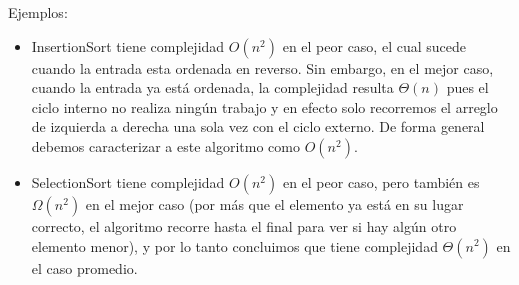Ejemplos:

\begin{itemize}
    \item InsertionSort tiene complejidad $O(n^2)$ en el peor caso, el cual sucede cuando la entrada esta ordenada en reverso. Sin embargo, en el mejor caso, cuando la entrada ya está ordenada, la complejidad resulta $\Theta(n)$ pues el ciclo interno no realiza ningún trabajo y en efecto solo recorremos el arreglo de izquierda a derecha una sola vez con el ciclo externo. De forma general debemos caracterizar a este algoritmo como $O(n^2)$.
    \item SelectionSort tiene complejidad $O(n^2)$ en el peor caso, pero también es $\Omega(n^2)$ en el mejor caso (por más que el elemento ya está en su lugar correcto, el algoritmo recorre hasta el final para ver si hay algún otro elemento menor), y por lo tanto concluimos que tiene complejidad $\Theta(n^2)$ en el caso promedio.
\end{itemize}

